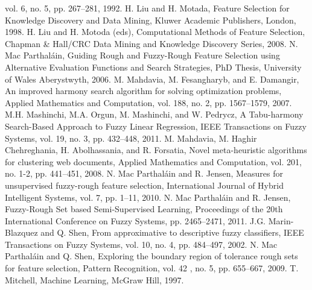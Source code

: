 vol. 6, no. 5, pp. 267--281,
1992.
H. Liu and H. Motada,
Feature Selection for Knowledge Discovery and Data Mining,
Kluwer Academic Publishers, London,
1998.
H. Liu and H. Motoda (eds),
Computational Methods of Feature Selection,
Chapman \& Hall/CRC Data Mining and Knowledge Discovery Series,
2008.
N. Mac Parthal\'{a}in,
Guiding Rough and Fuzzy-Rough Feature Selection using Alternative Evaluation Functions and Search Strategies,
PhD Thesis, University of Wales Aberystwyth,
2006.
M. Mahdavia, M. Fesangharyb, and E. Damangir,
An improved harmony search algorithm for solving optimization problems,
Applied Mathematics and Computation,
vol. 188, no. 2, pp. 1567--1579,
2007.
M.H. Mashinchi, M.A. Orgun, M. Mashinchi, and W. Pedrycz,
A Tabu-harmony Search-Based Approach to Fuzzy Linear Regression,
IEEE Transactions on Fuzzy Systems,
vol. 19, no. 3, pp. 432--448,
2011.
M. Mahdavia, M. Haghir Chehreghania, H. Abolhassania, and R. Forsatia,
Novel meta-heuristic algorithms for clustering web documents,
Applied Mathematics and Computation,
vol. 201, no. 1-2, pp. 441--451,
2008.
N. Mac Parthal\'{a}in and R. Jensen,
Measures for unsupervised fuzzy-rough feature selection,
International Journal of Hybrid Intelligent Systems,
vol. 7, pp. 1--11,
2010.
N. Mac Parthal\'{a}in and R. Jensen,
Fuzzy-Rough Set based Semi-Supervised Learning,
Proceedings of the 20th International Conference on Fuzzy Systems,
pp. 2465--2471,
2011.
J.G. Marin-Blazquez and Q. Shen,
From approximative to descriptive fuzzy classifiers,
IEEE Transactions on Fuzzy Systems,
vol. 10, no. 4, pp. 484--497,
2002.
N. Mac Parthal\'{a}in and Q. Shen,
Exploring the boundary region of tolerance rough sets for feature selection,
Pattern Recognition,
vol. 42 , no. 5, pp. 655--667,
2009.
T. Mitchell,
Machine Learning,
McGraw Hill,
1997.
